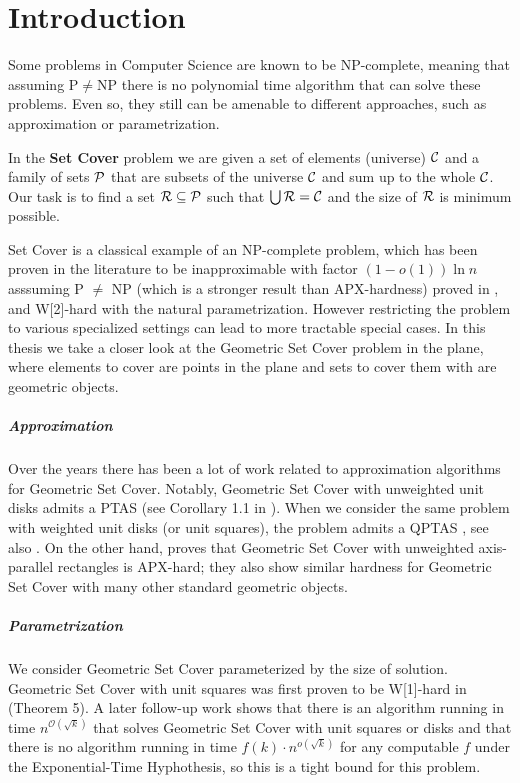 \chapter{Introduction}

Some problems in Computer Science are known to be NP-complete,
meaning that assuming P$\neq$NP there is no polynomial time
algorithm that can solve these problems.
Even so, they still can be amenable to different approaches,
such as approximation or parametrization.

\begin{defi}
In the \textbf{Set Cover} problem we are given a set of elements (universe)
$\mathcal{C}$ and a family of sets $\mathcal{P}$ that are subsets of the universe $\mathcal{C}$
and sum up to the whole $\mathcal{C}$.
Our task is to find a set $\mathcal{R} \subseteq \mathcal{P}$
such that $\bigcup \mathcal{R} = \mathcal{C}$ and the size of $\mathcal{R}$ is minimum possible.
\end{defi}

Set Cover is a classical example of an NP-complete problem,
which has been proven
in the literature to be
inapproximable with factor $(1-o(1))\ln n$ asssuming P $\neq$ NP
(which is a stronger result than APX-hardness)
proved in \cite{set_cover_inapproximation},
and W[2]-hard with the natural parametrization.
However restricting the problem to various specialized settings
can lead to more tractable special cases.
In this thesis we take a closer look at the Geometric Set Cover problem
in the plane, where elements to cover are points in the plane
and sets to cover them with are geometric objects.

\paragraph{Approximation}
Over the years there has been a lot of work related to approximation
algorithms for Geometric Set Cover. Notably,
Geometric Set Cover with unweighted unit disks admits a PTAS (see
Corollary 1.1 in \cite{unit_disks}). When we consider the same problem
with weighted unit disks (or unit squares), the problem admits a QPTAS
\cite{settling_apx_hardness}, see also \cite{voronoi_true}.
On the other hand, \cite{rectangles_apx_hard} 
proves that Geometric Set Cover with unweighted axis-parallel rectangles
is APX-hard; they also show similar hardness
for Geometric Set Cover with many other standard geometric objects.

\paragraph{Parametrization}
We consider Geometric Set Cover 
parameterized by the size of solution.
Geometric Set Cover with unit squares was first proven to be W[1]-hard 
in \cite{marx05} (Theorem 5). A later follow-up work \cite{voronoi}
shows that there is an algorithm running in time $n^{\mathcal{O}(\sqrt{k})}$
that solves Geometric Set Cover with unit squares or disks
and that there is no algorithm running in time $f(k) \cdot n^{o(\sqrt{k})}$
for any computable $f$ under the Exponential-Time Hyphothesis,
so this is a tight bound for this problem.

